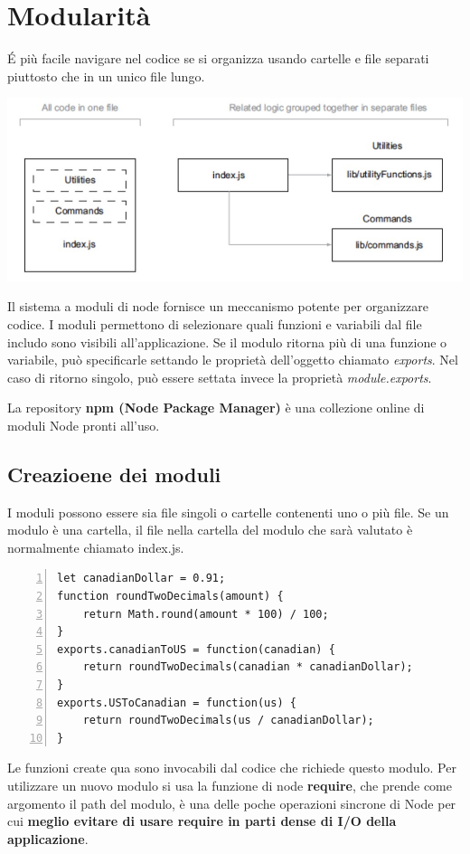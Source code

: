 \section{Modularità}
\'E più facile navigare nel codice se si organizza usando cartelle e file separati piuttosto che in un unico file lungo. 
\begin{center}
    \includegraphics[scale = 0.4]{Images/TecnologieWeb/8/Modularity.jpg}
\end{center}

Il sistema a moduli di node fornisce un meccanismo potente per organizzare codice. I moduli permettono di selezionare quali funzioni e variabili dal file includo sono visibili all'applicazione. Se il modulo ritorna più di una funzione o variabile, può specificarle settando le proprietà dell'oggetto chiamato \emph{exports}. Nel caso di ritorno singolo, può essere settata invece la proprietà \emph{module.exports}.

La repository \textbf{npm (Node Package Manager)} è una collezione online di moduli Node pronti all'uso.

\subsection{Creazioene dei moduli}
I moduli possono essere sia file singoli o cartelle contenenti uno o più file. Se un modulo è una cartella, il file nella cartella del modulo che sarà valutato è normalmente chiamato index.js.

\begin{Verbatim}[numbers = left, frame = single]
let canadianDollar = 0.91;
function roundTwoDecimals(amount) {
    return Math.round(amount * 100) / 100;
}
exports.canadianToUS = function(canadian) {
    return roundTwoDecimals(canadian * canadianDollar);
}
exports.USToCanadian = function(us) {
    return roundTwoDecimals(us / canadianDollar);
}
\end{Verbatim}
Le funzioni create qua sono invocabili dal codice che richiede questo modulo. Per utilizzare un nuovo modulo si usa la funzione di node \textbf{require}, che prende come argomento il path del modulo, è una delle poche operazioni sincrone di Node per cui \textbf{meglio evitare di usare require in parti dense di I/O della applicazione}. \\

